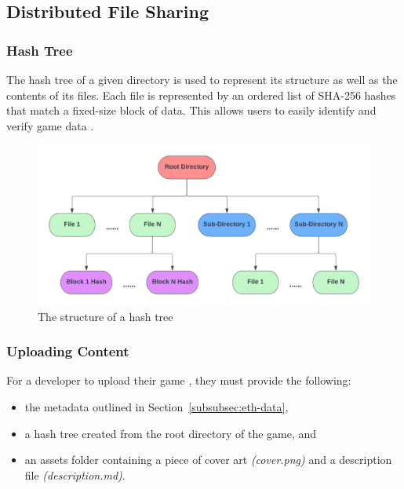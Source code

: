 
\subsection{Distributed File Sharing}
\label{subsec:design-p2p}

\subsubsection*{Hash Tree}
\label{subsubsec:hash-tree}

The hash tree of a given directory is used to represent its structure as well as the contents of its files. Each file is represented by an ordered list of SHA-256 hashes that match a fixed-size block of data. This allows users to easily identify and verify game data .

\begin{figure}[ht]
  \centering
  \includegraphics[width=.85\textwidth]{assets/images/diagrams/block-body.png}
  \caption{The structure of a hash tree}
  \label{fig:hash-storage}
\end{figure}

\subsubsection*{Uploading Content}
\label{subsubsec:upload-content}

For a developer to upload their game , they must provide the following:

\begin{itemize}
  \item the metadata outlined in Section~\ref{subsubsec:eth-data},
  \item a hash tree created from the root directory of the game, and
  \item an assets folder containing a piece of cover art \textit{(cover.png)} and a description file \textit{(description.md)}.
\end{itemize}

